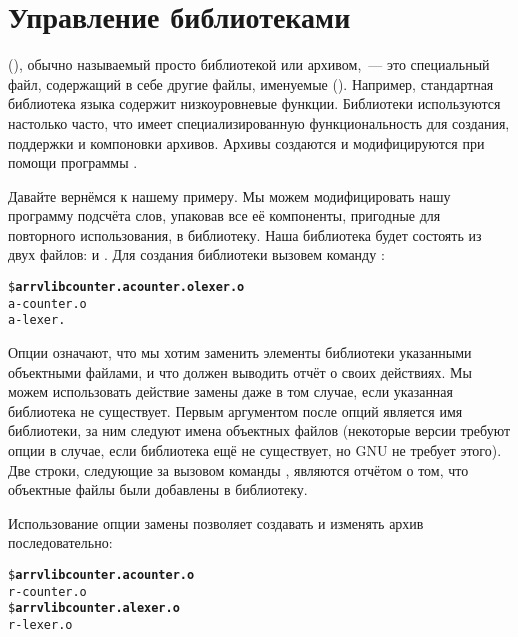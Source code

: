 \section{Управление библиотеками}
\label{sec:managing_libs}

 
 
 (), обычно
называемый просто библиотекой или архивом,~--- это специальный файл,
содержащий в себе другие файлы, именуемые 
(). Например, стандартная библиотека языка
\Clang{}  содержит низкоуровневые функции. Библиотеки
используются настолько часто, что \GNUmake{} имеет специализированную
функциональность для создания, поддержки и компоновки архивов. Архивы
создаются и модифицируются при помощи программы .

Давайте вернёмся к нашему примеру. Мы можем модифицировать нашу
программу подсчёта слов, упаковав все её компоненты, пригодные для
повторного использования, в библиотеку.  Наша библиотека будет
состоять из двух файлов:  и .
Для создания библиотеки вызовем команду :

{\footnotesize
\begin{alltt}
\$ \textbf{ar rv libcounter.a counter.o lexer.o}
a - counter.o
a - lexer.
\end{alltt}
}

Опции  означают, что мы хотим заменить элементы библиотеки
указанными объектными файлами, и что  должен выводить отчёт
о своих действиях. Мы можем использовать действие замены даже в том
случае, если указанная библиотека не существует. Первым аргументом
после опций является имя библиотеки, за ним следуют имена объектных
файлов (некоторые версии  требуют опции  в
случае, если библиотека ещё не существует, но GNU  не
требует этого). Две строки, следующие за вызовом команды ,
являются отчётом о том, что объектные файлы были добавлены в
библиотеку.

Использование опции замены позволяет создавать и изменять архив
последовательно:

{\footnotesize
\begin{alltt}
\$ \textbf{ar rv libcounter.a counter.o}
r - counter.o
\$ \textbf{ar rv libcounter.a lexer.o}
r - lexer.o
\end{alltt}
}

